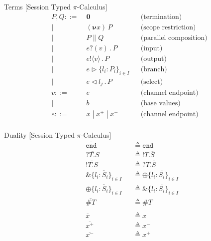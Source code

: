 \documentclass[dvipsnames]{beamer}
\newcommand{\Picalc}{$\pi$-Calculus}
\newcommand{\PO}{\textbf{0}}
\newcommand{\comp}[2]{#1 \parallel #2}
\newcommand{\new}[1]{(\boldsymbol{\nu} #1) \,}
\newcommand{\send}[2]{#1 !\langle #2 \rangle \, . \,}
\newcommand{\recv}[2]{#1 ?( #2 ) \, . \,}
\newcommand{\branch}[3]{#1 \triangleright \{ #2 \}_{#3}}
\newcommand{\select}[2]{#1 \triangleleft #2 \, . \,}
\newcommand{\type}[1]{\mathtt{#1}}
\newcommand{\tend}[0]{\type{end}}
\newcommand{\trecv}[1]{\type{?} #1 \type{.}}
\newcommand{\tsend}[1]{\type{!} #1 \type{.}}
\newcommand{\tbranch}[2]{\type{\&} \{ #1 \}_{#2}}
\newcommand{\tselect}[2]{\type{\oplus} \{ #1 \}_{#2}}
\newcommand{\tchannel}[0]{\type{\#}}
\newcommand{\dual}[1]{\overline{#1}}
\newcommand{\is}[0]{\triangleq}
\newcommand{\slidetitle}[2]{#2 \hspace*{\fill} [#1]}
\begin{document}
  \begin{frame}{\slidetitle{Session Typed \Picalc{}}{Terms}}
    \begin{equation*}
      \begin{aligned}
        P, Q ::=& \; \PO                     &&\text{(termination)}    \\ 
        |& \; \new{x}P                       &&\text{(scope restriction)} \\ 
        |& \; \comp{P}{Q}                    &&\text{(parallel composition)} \\ 
        |& \; \recv{e}{v}P                   &&\text{(input)}       \\ 
        |& \; \send{e}{v}P                   &&\text{(output)}       \\           
        |& \; \branch{e}{l_i : P_i}{i \in I} &&\text{(branch)}       \\ 
        |& \; \select{e}{l_j}P               &&\text{(select)}       \\           
        v ::=& \; e && \text{(channel endpoint)}\\
        |& \; b && \text{(base values)}\\
        e ::=& \; x \; | \; x^+ \; | \; x^- && \text{(channel endpoint)}\\
      \end{aligned}
    \end{equation*}
  \end{frame}

  \begin{frame}{\slidetitle{Session Typed \Picalc{}}{Duality}}
    \begin{equation*}
      \begin{aligned}
        &\dual{\tend}          &&\is \tend\\
        &\dual{\trecv{T}S}     &&\is \tsend{T}\dual{S}\\
        &\dual{\tsend{T}S}     &&\is \trecv{T}\dual{S}\\
        &\dual{\tbranch{l_i : S_i}{i \in I}} &&\is \tselect{l_i : \dual{S_i}}{i \in I}\\
        &\dual{\tselect{l_i : S_i}{i \in I}} &&\is \tbranch{l_i : \dual{S_i}}{i \in I}\\
        &\dual{\tchannel{T}}   &&\is \tchannel{T}\\
        \\
        &\dual{x}   &&\is x\\
        &\dual{x^+} &&\is x^-\\
        &\dual{x^-} &&\is x^+\\
      \end{aligned}
    \end{equation*}
  \end{frame}
\end{document}
